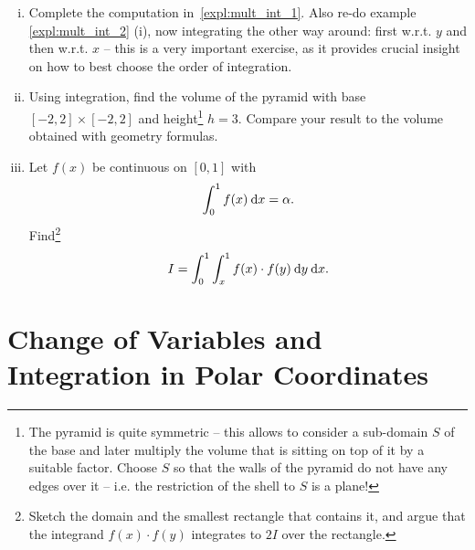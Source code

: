 \begin{exercise}
\begin{enumerate}[(i)]
	\item Complete the computation in~\ref{expl:mult_int_1}. Also re-do example \ref{expl:mult_int_2} (i), now integrating the other way around: first w.r.t. $y$ and then w.r.t. $x$ -- this is a very important exercise, as it provides crucial insight on how to best choose the order of integration.
	\item Using integration, find the volume of the pyramid with base $[-2,2]\times[-2,2]$ and height\footnote{The pyramid is quite symmetric -- this allows to consider a sub-domain $S$ of the base and later multiply the volume that is sitting on top of it by a suitable factor. Choose $S$ so that the walls of the pyramid do not have any edges over it -- i.e. the restriction of the shell to $S$ is a plane!} $h=3$. Compare your result to the volume obtained with geometry formulas.
	\item Let $f(x)$ be continuous on $[0,1]$ with
	\[ \int_{0}^{1} f(x) \: \mathrm{d} x = \alpha. \]
	Find\footnote{Sketch the domain and the smallest rectangle that contains it, and argue that the integrand $f(x) \cdot f(y)$ integrates to $2I$ over the rectangle.}
	\[ I = \int_{0}^{1} \int_{x}^{1} f(x) \cdot f(y) \: \mathrm{d} y \: \mathrm{d} x. \]
\end{enumerate}
\end{exercise}

\section{Change of Variables and Integration in Polar Coordinates}

